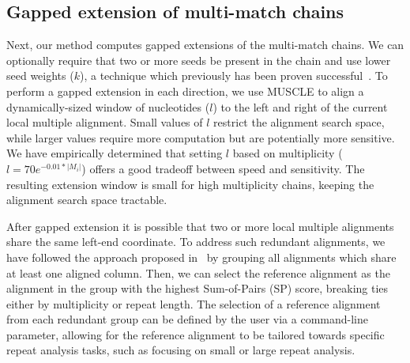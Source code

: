 \documentclass[12pt,journal,letterpaper,onecolumn, draftcls]{IEEEtran}
\begin{document}
\subsection{Gapped extension of multi-match chains}
Next, our method computes gapped extensions of the multi-match chains.
We can optionally require that two or more seeds be present
in the chain and use lower seed weights ($k$), a technique which previously has
been proven
successful~\cite{ref-blastz,ref-gappedblast,ref-blat}.  To perform a
gapped extension in each direction, we use MUSCLE to align a dynamically-sized window
of nucleotides ($l$) to the left and right of the current local
multiple alignment.  Small values of $l$ restrict the alignment search
space, while larger values require more computation but are
potentially more sensitive.  We have empirically determined that
setting $l$ based on multiplicity ($l = 70e^{-0.01*|M_{i}|}$) offers a
good tradeoff between speed and sensitivity.  The resulting extension
window is small for high multiplicity chains,
keeping the alignment search space tractable.

After gapped extension it is possible that two or more
local multiple alignments share the same left-end coordinate. To address such redundant alignments, we have followed
the approach proposed in~\cite{ref-related1} by grouping all alignments which share at least one aligned column. Then, we can select the reference alignment
as the alignment in the group with the highest Sum-of-Pairs (SP) score, breaking ties either by multiplicity or repeat length. The selection of a reference alignment from each redundant group can be defined by the user via a command-line parameter, allowing for the reference alignment to be tailored towards specific repeat analysis tasks, such as focusing on small or large repeat analysis.
\end{document}
